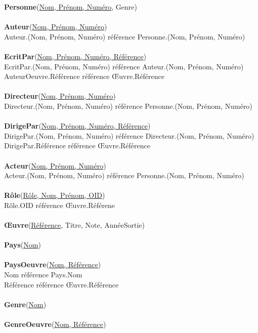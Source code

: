 \documentclass[10pt,a4paper]{article}
\begin{document}
\textbf{Personne}(\underline{Nom, Prénom, Numéro}, Genre)
\\
\\
\textbf{Auteur}(\underline{Nom, Prénom, Numéro})
\\
		Auteur.(Nom, Prénom, Numéro) référence Personne.(Nom, Prénom, Numéro)
\\ \\
\textbf{EcritPar}(\underline{Nom, Prénom, Numéro, Référence})
\\
		EcritPar.(Nom, Prénom, Numéro) référence Auteur.(Nom, Prénom, Numéro)
\\
		AuteurOeuvre.Référence référence Œuvre.Référence
\\
\\
\textbf{Directeur}(\underline{Nom, Prénom, Numéro})
\\
		Directeur.(Nom, Prénom, Numéro) référence Personne.(Nom, Prénom, Numéro)
\\ \\
\textbf{DirigePar}(\underline{Nom, Prénom, Numéro, Référence})
\\
		DirigePar.(Nom, Prénom, Numéro) référence Directeur.(Nom, Prénom, Numéro)
        \\
		DirigePar.Référence référence Œuvre.Référence
\\
\\
\textbf{Acteur}(\underline{Nom, Prénom, Numéro})
\\
		Acteur.(Nom, Prénom, Numéro) référence Personne.(Nom, Prénom, Numéro)
\\
\\
\textbf{Rôle}(\underline{Rôle, Nom, Prénom, OID})
\\
		Rôle.OID référence Œuvre.Référene
\\
\\
\textbf{Œuvre}(\underline{Référence}, Titre, Note, AnnéeSortie)
\\
\\
\textbf{Pays}(\underline{Nom})
\\
\\
\textbf{PaysOeuvre}(\underline{Nom, Référence})
\\
		Nom référence Pays.Nom
        \\
		Référence référence Œuvre.Référence
\\ 
\\
\textbf{Genre}(\underline{Nom})
\\
\\
\textbf{GenreOeuvre}(\underline{Nom, Référence})
\\
\end{document}
